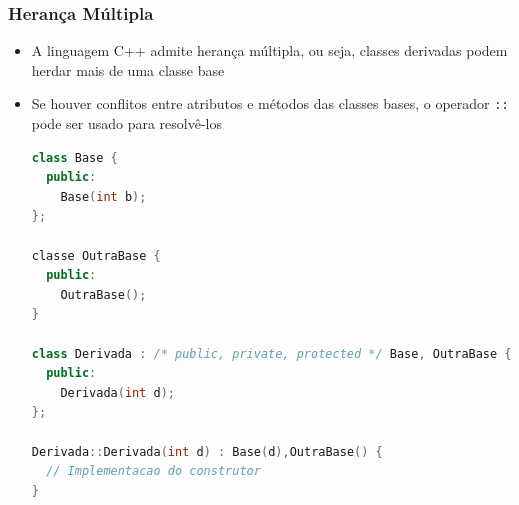 \documentclass[aspectratio=169]{beamer}
\begin{document}
\begin{frame}[fragile]\frametitle{Herança Múltipla}
\begin{itemize}
	\item A linguagem C++ admite herança múltipla, ou seja, classes derivadas podem herdar mais de uma classe base
	\item Se houver conflitos entre atributos e métodos das classes bases, o operador \texttt{::} pode ser usado para resolvê-los
\begin{lstlisting}[language=C++,basicstyle=\ttfamily\tiny]
class Base {
  public:
    Base(int b);
};

classe OutraBase {
  public:
    OutraBase();
}

class Derivada : /* public, private, protected */ Base, OutraBase {
  public:
    Derivada(int d);
};

Derivada::Derivada(int d) : Base(d),OutraBase() {
  // Implementacao do construtor
}
\end{lstlisting}
\end{itemize}
\end{frame}
\end{document}
